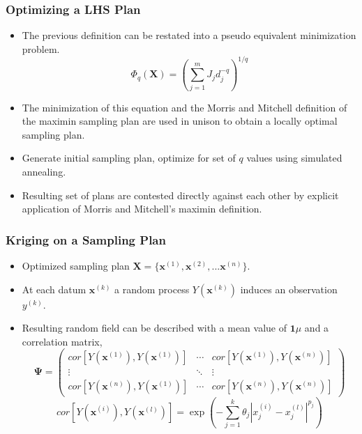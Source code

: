 \documentclass{beamer}
\begin{document}
\begin{frame}
\frametitle{Optimizing a LHS Plan}

\begin{itemize}
  \item The previous definition can be restated into a pseudo equivalent minimization problem.
\begin{equation}
\label{eq:Phi_q}
   \Phi_q(\textbf{X}) = \left(\sum_{j=1}^m J_j d_j^{-q} \right)^{1/q} \nonumber
\end{equation}
  \item The minimization of this equation and the Morris and Mitchell definition of the maximin sampling plan are used in unison to obtain a locally optimal sampling plan.
  \item Generate initial sampling plan, optimize for set of $q$ values using simulated annealing.  
  \item Resulting set of plans are contested directly against each other by explicit application of Morris and Mitchell's maximin definition. 
\end{itemize}

\end{frame}
\begin{frame}
\frametitle{Kriging on a Sampling Plan}

\begin{itemize}
  \item Optimized sampling plan $\textbf{X}=\lbrace \textbf{x}^{(1)}, \textbf{x}^{(2)}, ... \textbf{x}^{(n)}\rbrace$. 
  \item At each datum $\textbf{x}^{(k)}$ a random process $Y(\textbf{x}^{(k)})$ induces an observation $y^{(k)}$.
  \item Resulting random field can be described with a mean value of $\textbf{1}\mu$ and a correlation matrix,
\begin{equation}
 \boldsymbol{\Psi} =
 \begin{pmatrix} 
	cor[Y(\textbf{x}^{(1)}), Y(\textbf{x}^{(1)})] & \cdots & 
		cor[Y(\textbf{x}^{(1)}), Y(\textbf{x}^{(n)})] \\
	\vdots & \ddots & \vdots \\ 
	cor[Y(\textbf{x}^{(n)}), Y(\textbf{x}^{(1)})] & \cdots & 
		cor[Y(\textbf{x}^{(n)}), Y(\textbf{x}^{(n)})]
 \end{pmatrix} \nonumber
\end{equation}  
\begin{equation}
   cor[Y(\textbf{x}^{(i)}), Y(\textbf{x}^{(l)})] = 
    \exp\left(-\sum_{j=1}^k \theta_j |x_j^{(i)} - x_j^{(l)} |^{p_j} \right) \nonumber
\end{equation}
\end{itemize}

\end{frame}
\end{document}
